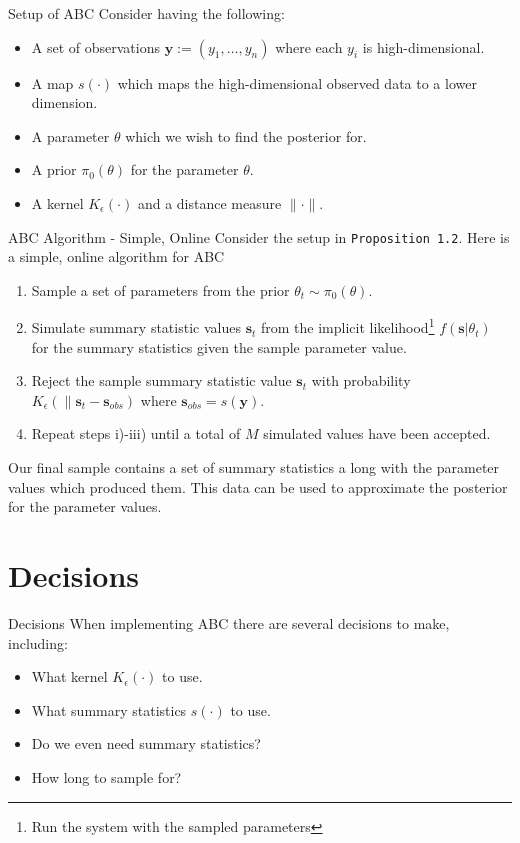 \documentclass[11pt,a4paper]{article}
\begin{document}
  \begin{proposition}{Setup of ABC}
    Consider having the following:
    \begin{itemize}
      \item A set of observations $\mathbf{y}:=(y_1,\dots,y_n)$ where each $y_i$ is high-dimensional.
      \item A map $s(\cdot)$ which maps the high-dimensional observed data to a lower dimension.
      \item A parameter $\theta$ which we wish to find the posterior for.
      \item A prior $\pi_0(\theta)$ for the parameter $\theta$.
      \item A kernel $K_\epsilon(\cdot)$ and a distance measure $\|\cdot\|$.
    \end{itemize}
  \end{proposition}

  \begin{proposition}{ABC Algorithm - Simple, Online}
    Consider the setup in \texttt{Proposition 1.2}. Here is a simple, online algorithm for ABC
    \begin{enumerate}
      \item Sample a set of parameters from the prior $\theta_t\sim\pi_0(\theta)$.
      \item Simulate summary statistic values $\mathbf{s}_t$ from the implicit likelihood\footnote{Run the system with the sampled parameters} $f(\mathbf{s}|\theta_t)$ for the summary statistics given the sample parameter value.
      \item Reject the sample summary statistic value $\mathbf{s}_t$ with probability $K_\epsilon(\|\mathbf{s}_t-\mathbf{s}_{obs})$ where ${\mathbf{s}_{obs}=s(\mathbf{y})}$.
      \item Repeat steps i)-iii) until a total of $M$ simulated values have been accepted.
    \end{enumerate}
    Our final sample contains a set of summary statistics a long with the parameter values which produced them. This data can be used to approximate the posterior for the parameter values.
  \end{proposition}

\section*{Decisions}

  \begin{remark}{Decisions}
    When implementing ABC there are several decisions to make, including:
    \begin{itemize}
      \item What kernel $K_\epsilon(\cdot)$ to use.
      \item What summary statistics $s(\cdot)$ to use.
      \item Do we even need summary statistics?
      \item How long to sample for?
    \end{itemize}
  \end{remark}
\end{document}
